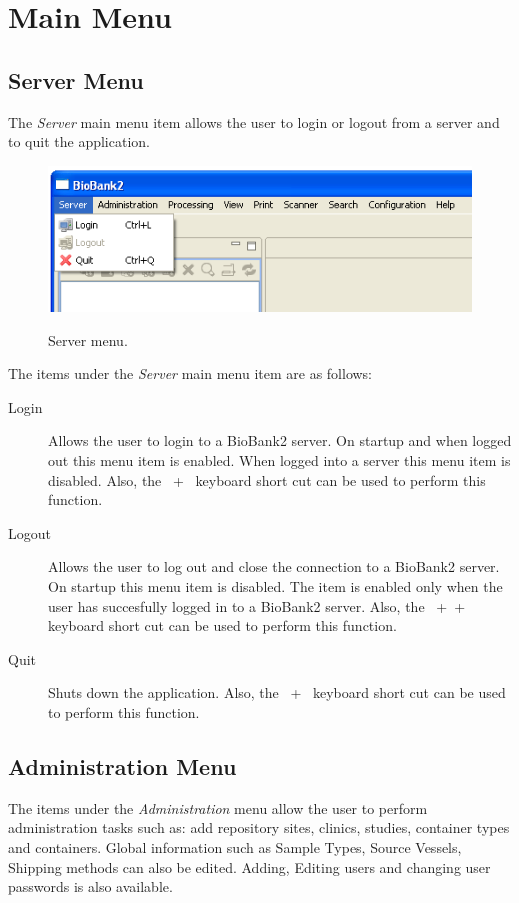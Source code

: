 \section{Main Menu}
\label{sec:main_menu}

\subsection{Server Menu}
The \emph{Server} main menu item allows the user to login or logout from a
server and to quit the application.
\begin{figure}[H]
  \centering
  \scalebox{0.5}
	   { \includegraphics*{screenshots/overview/main_menu_server} }
	   \caption{Server menu.}
	   \label{fig:main_menu_server}
\end{figure}
The items under the \emph{Server} main menu item are as follows:
\begin{description}
\item[Login] Allows the user to login to a BioBank2 server. On startup and
  when logged out this menu item is enabled. When logged into a server this
  menu item is disabled. Also, the \mbox{ + } keyboard
  short cut can be used to perform this function.
\item[Logout] Allows the user to log out and close the connection to a
  BioBank2 server. On startup this menu item is disabled. The item is enabled
  only when the user has succesfully logged in to a BioBank2 server. Also,
  the \mbox{ +  + } keyboard short cut can be
  used to perform this function.
\item[Quit] Shuts down the application. Also, the \mbox{ +
  } keyboard short cut can be used to perform this function.
\end{description}

\subsection{Administration Menu}
The items under the \emph{Administration} menu allow the user to perform
administration tasks such as: add repository sites, clinics, studies, container
types and containers. Global information such as Sample Types, Source Vessels,
Shipping methods can also be edited. Adding, Editing users and changing user
passwords is also available.


